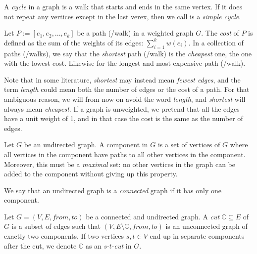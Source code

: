 \begin{definition}[Cycle]
    A \emph{cycle} in a graph is a walk that starts and ends in the same vertex. If it does not repeat any vertices except in the last verex, then we call is a \emph{simple cycle}.
\end{definition}

\begin{definition}
    Let $P := [e_1, e_2, ..., e_k]$ be a path (/walk) in a weighted graph $G$. The \emph{cost} of $P$ is defined as the sum of the weights of its edges: $\sum_{i=1}^k w(e_i)$. In a collection of paths (/walks), we say that the \emph{shortest} path (/walk) is the \emph{cheapest} one, the one with the lowest cost. Likewise for the longest and most expensive path (/walk). 
\end{definition}

Note that in some literature, \emph{shortest} may instead mean \emph{fewest edges}, and the term \emph{length} could mean both the number of edges or the cost of a path. For that ambiguous reason, we will from now on avoid the word \emph{length}, and \emph{shortest} will always mean \emph{cheapest}. If a graph is unweighted, we pretend that all the edges have a unit weight of 1, and in that case the cost is the same as the number of edges.

\begin{definition}
    Let $G$ be an undirected graph. A component in $G$ is a set of vertices of $G$ where all vertices in the component have paths to all other vertices in the component. Moreover, this must be a \emph{maximal} set: no other vertices in the graph can be added to the component without giving up this property.
\end{definition}

\begin{definition}
    We say that an undirected graph is a \emph{connected} graph if it has only one component.
\end{definition}

\begin{definition}[Cut]
    Let $G = (V, E, from, to)$ be a connected and undirected graph. A \emph{cut} $\mathbb{C} \subseteq E$ of $G$ is a subset of edges such that $(V, E \setminus \mathbb{C}, from, to)$ is an unconnected graph of exactly two components. If two vertices $s,t \in V$ end up in separate components after the cut, we denote $\mathbb{C}$ as an $s$-$t$-\emph{cut} in $G$.
\end{definition}
